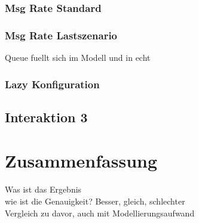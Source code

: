 \subsubsection{Msg Rate Standard}
\subsubsection{Msg Rate Lastszenario}
Queue fuellt sich im Modell und in echt
\subsubsection{Lazy Konfiguration}

\subsection{Interaktion 3}


\section{Zusammenfassung}
Was ist das Ergebnis \\
wie ist die Genauigkeit? Besser, gleich, schlechter\\
Vergleich zu davor, auch mit Modellierungsaufwand \\



